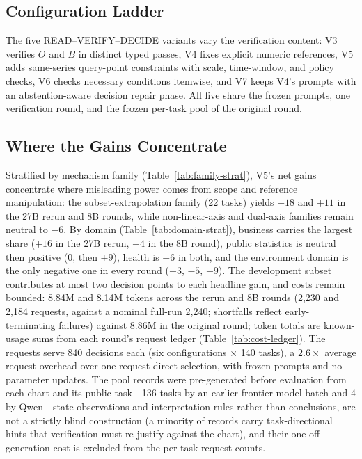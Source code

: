 \subsection{Configuration Ladder}\label{app:ladder}
The five READ--VERIFY--DECIDE variants vary the
verification content: V3 verifies $O$ and $B$ in distinct
typed passes, V4 fixes explicit numeric references, V5
adds same-series query-point constraints with scale,
time-window, and policy checks, V6 checks necessary
conditions itemwise, and V7 keeps V4's prompts with an
abstention-aware decision repair phase. All five share
the frozen prompts, one verification round, and the
frozen per-task pool of the original round.

\subsection{Where the Gains Concentrate}
Stratified by mechanism family
(Table~\ref{tab:family-strat}), V5's net gains
concentrate where misleading power comes from scope and
reference manipulation: the subset-extrapolation family
(22 tasks) yields $+18$ and $+11$ in the 27B rerun and
8B rounds, while non-linear-axis and dual-axis families
remain neutral to $-6$.
By domain (Table~\ref{tab:domain-strat}), business
carries the largest share ($+16$ in the 27B rerun, $+4$
in the 8B round), public statistics is neutral then
positive ($0$, then $+9$), health is $+6$ in both, and
the environment domain is the only negative one in
every round ($-3$, $-5$, $-9$).
The development subset contributes at most two
decision points to each headline gain, and costs
remain bounded: 8.84M and 8.14M tokens across the rerun and 8B rounds (2{,}230 and 2{,}184 requests, against a nominal full-run 2{,}240; shortfalls reflect early-terminating failures) against 8.86M in the original round; token totals are
known-usage sums from each round's request ledger
(Table~\ref{tab:cost-ledger}). The
requests serve 840 decisions each
(six configurations $\times$ 140 tasks), a $2.6\times$ average request overhead over one-request direct selection, with frozen prompts and no parameter updates.
The pool records were pre-generated before evaluation
from each chart and its public task---136 tasks by an
earlier frontier-model batch and 4 by Qwen---state observations and interpretation rules rather than conclusions, are not a strictly blind construction (a minority of records carry task-directional hints that verification must re-justify against the chart), and their one-off generation cost is excluded from the per-task request counts.

